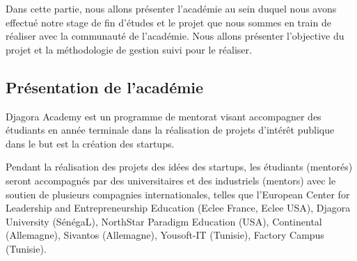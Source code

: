 
Dans cette partie, nous allons présenter l'académie 
au sein duquel nous avons effectué notre stage de fin d'études et le projet
 que nous sommes en train de réaliser avec la communauté
de l'académie. Nous allons présenter l'objective du projet et la méthodologie de
gestion suivi pour le réaliser.

\subsection{Présentation de l'académie}

Djagora Academy est un programme de mentorat visant accompagner des étudiants
en année terminale dans la réalisation de projets d'intérêt publique dans le but
est la création des startups.

Pendant la réalisation des projets des idées des startups, les étudiants
(mentorés)  seront accompagnés par des universitaires et des industriels
(mentors) avec le soutien de plusieurs compagnies internationales, telles que
l'European Center for Leadership and Entrepreneurship Education (Eclee France,
Eclee USA), Djagora University (SénégaL), NorthStar Paradigm Education (USA),
Continental (Allemagne), Sivantos (Allemagne), Yousoft-IT (Tunisie),
Factory Campus (Tunisie).



